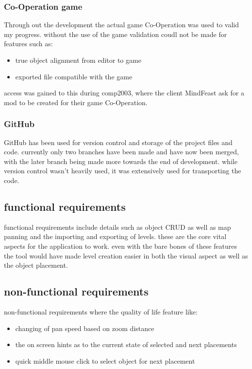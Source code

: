 \subsubsection{Co-Operation game}
Through out the development the actual game Co-Operation was used to valid my progress. without the use of the game validation coudl not be made for features such as: 
\begin{itemize}
	\item true object alignment from editor to game
	\item exported file compatible with the game
\end{itemize}
access was gained to this during comp2003, where the client MindFeast ask for a mod to be created for their game Co-Operation.
\subsubsection{GitHub}
GitHub has been used for version control and storage of the project files and code. currently only two branches have been made and have now been merged, with the later branch being made more towards the end of development. while version control wasn't heavily used, it was extensively used for transporting the code.

\subsection{functional requirements}
functional requirements include details such as object CRUD as well as map panning and the importing and exporting of levels. these are the core vital aspects for the application to work. even with the bare bones of these features the tool would have made level creation easier in both the visual aspect as well as the object placement.

\subsection{non-functional requirements}
non-functional requirements where the quality of life feature like: 
\begin{itemize}
	\item changing of pan speed based on zoom distance
	\item the on screen hints as to the current state of selected and next placements
	\item quick middle mouse click to select object for next placement
\end{itemize}

